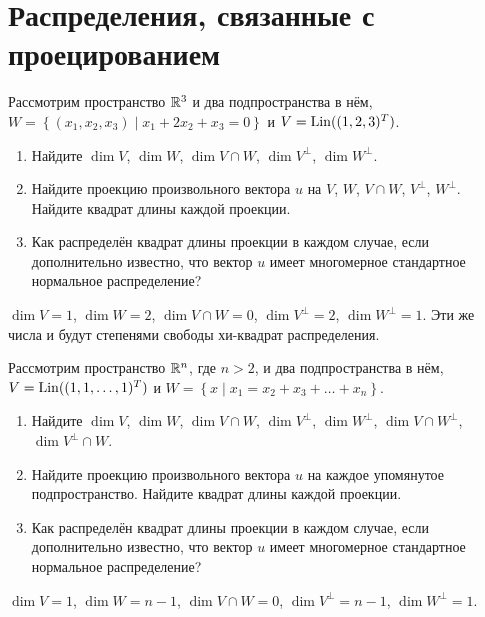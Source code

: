 \section{Распределения, связанные с проецированием}


\begin{problem}
Рассмотрим пространство $\mathbb R^3$ и два подпространства в нём, $W = \left\{ (x_1, x_2, x_3) \mid x_1 + 2x_2 + x_3 =0 \right\}$ и $V = \operatorname{Lin}((1,2,3)^T)$.

\begin{enumerate}
\item Найдите $\dim V$, $\dim W$, $\dim V \cap W$, $\dim V^{\perp}$, $\dim W^{\perp}$.
\item Найдите проекцию произвольного вектора $u$ на $V$, $W$, $V\cap W$, $V^{\perp}$,
$W^{\perp}$. Найдите квадрат длины каждой проекции.
\item Как распределён квадрат длины проекции в каждом случае,
если дополнительно известно,
что вектор $u$ имеет многомерное стандартное нормальное распределение?
\end{enumerate}

\begin{sol}
$\dim V = 1$, $\dim W = 2$, $\dim V \cap W =0$, $\dim V^{\perp}=2$, $\dim W^{\perp}=1$.
Эти же числа и будут степенями свободы хи-квадрат распределения.
\end{sol}
\end{problem}





\begin{problem}
Рассмотрим пространство $\mathbb R^n$, где $n>2$, и два подпространства в нём, $V = \operatorname{Lin}((1,1, \ldots, 1)^T)$
и $W = \left\{ x \mid x_1 = x_2 + x_3  + \ldots + x_n \right\}$.

\begin{enumerate}
\item Найдите $\dim V$, $\dim W$, $\dim V \cap W$, $\dim V^{\perp}$,
$\dim W^{\perp}$, $\dim V \cap W^{\perp}$, $\dim V^{\perp} \cap W$.

\item Найдите проекцию произвольного вектора $u$ на каждое упомянутое подпространство.
Найдите квадрат длины каждой проекции.
\item Как распределён квадрат длины проекции в каждом случае,
если дополнительно известно,
что вектор $u$ имеет многомерное стандартное нормальное распределение?
\end{enumerate}

\begin{sol}
$\dim V = 1$, $\dim W = n-1$, $\dim V \cap W =0$, $\dim V^{\perp}=n-1$, $\dim W^{\perp}=1$.
\end{sol}
\end{problem}

